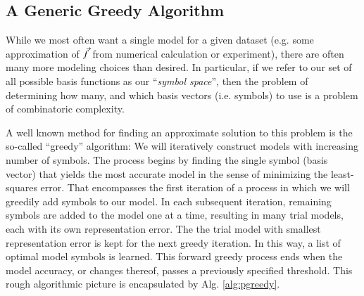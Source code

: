 \documentclass[twocolumn,aps,prd,floatfix,preprintnumbers,a4paper,nofootinbib,
superscriptaddress,10pt]{revtex4-1}
\begin{document}
\subsection{A Generic Greedy Algorithm}
%
While we most often want a single model for a given dataset (e.g. some approximation of $\vec{f}$ from numerical calculation or experiment), there are often many more modeling choices than desired.
%
In particular, if we refer to our set of all possible basis functions as our ``\textit{symbol space}'', then the problem of determining how many, and which basis vectors (i.e. symbols) to use is a problem of combinatoric complexity.
%
\par A well known method for finding an approximate solution to this problem is the so-called ``greedy'' algorithm:
%
We will iteratively construct models with increasing number of symbols.
%
The process begins by finding the single symbol (basis vector) that yields the most accurate model in the sense of minimizing the least-squares error.
%
That encompasses the first iteration of a process in which we will greedily add symbols to our model.
%
In each subsequent iteration, remaining symbols are added to the model one at a time, resulting in many trial models, each with its own representation error.
%
The the trial model with smallest representation error is kept for the next greedy iteration.
%
In this way, a list of optimal model symbols is learned.
%
This forward greedy process ends when the model accuracy, or changes thereof, passes a previously specified threshold.
%
This rough algorithmic picture is encapsulated by Alg. \ref{alg:pgreedy}.
%
\hspace{1cm}
\end{document}
